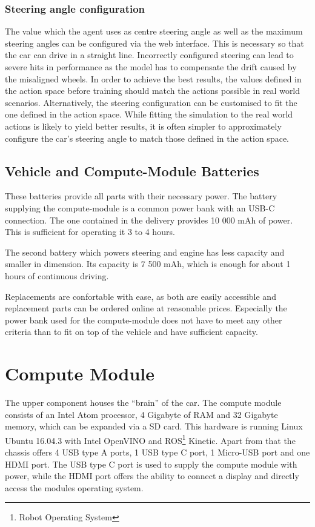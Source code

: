 \subsubsection{Steering angle configuration}
The value which the agent uses as centre steering angle as well as the maximum steering angles can be configured via the web interface. This is necessary so that the car can drive in a straight line. Incorrectly configured steering can lead to severe hits in performance as the model has to compensate the drift caused by the misaligned wheels. In order to achieve the best results, the values defined in the action space before training should match the actions possible in real world scenarios. Alternatively, the steering configuration can be customised to fit the one defined in the action space. While fitting the simulation to the real world actions is likely to yield better results, it is often simpler to approximately configure the car's steering angle to match those defined in the action space.

\subsection{Vehicle and Compute-Module Batteries}
These batteries provide all parts with their necessary power. The battery supplying the compute-module is a common power bank with an USB-C connection. The one contained in the delivery provides 10 000 mAh of power. This is sufficient for operating it 3 to 4 hours. 

The second battery which powers steering and engine has less capacity and smaller in dimension. Its capacity is 7 500 mAh, which is enough for about 1 hours of continuous driving.

Replacements are confortable with ease, as both are easily accessible and replacement parts can be ordered online at reasonable prices. Especially the power bank used for the compute-module does not have to meet any other criteria than to fit on top of the vehicle and have sufficient capacity.

\section{Compute Module}
The upper component houses the ``brain'' of the car. The compute module consists of an Intel Atom
processor, 4 Gigabyte of RAM and 32 Gigabyte memory, which can be expanded via a SD card. This hardware is running Linux Ubuntu 16.04.3 with Intel OpenVINO\texttrademark{} and ROS\footnote{Robot Operating System} Kinetic. Apart from that the chassis offers 4 USB type A ports, 1 USB type C port, 1 Micro-USB port and one HDMI port. The USB type C port is used to supply the compute module with power, while the HDMI port offers the ability to connect a display and directly access the modules operating system.


